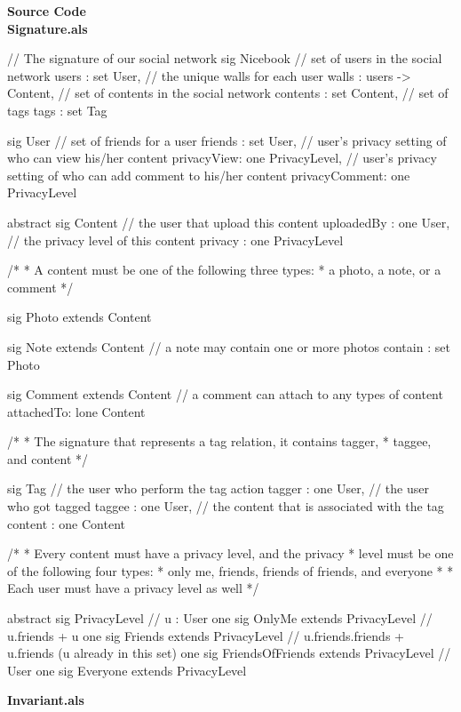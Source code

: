 \documentclass[titlepage]{article}
\begin{document}
{\bf\Large Source Code}\\[1ex]
{\bf\large Signature.als}
\begin{alloy}
// The signature of our social network 
sig Nicebook {
    // set of users in the social network
    users : set User,
    // the unique walls for each user
    walls : users -> Content,
    // set of contents in the social network
    contents : set Content,
    // set of tags
    tags : set Tag
}

sig User {
    // set of friends for a user
    friends : set User,
    // user's privacy setting of who can view his/her content
    privacyView: one PrivacyLevel,
    // user's privacy setting of who can add comment to his/her content
    privacyComment: one PrivacyLevel
}

abstract sig Content {
    // the user that upload this content
    uploadedBy : one User,
    // the privacy level of this content
    privacy : one PrivacyLevel
}

/*
*  	A content must be one of the following three types:
* 	a photo, a note, or a comment
*/

sig Photo extends Content {}

sig Note extends Content {
    // a note may contain one or more photos
    contain : set Photo
}

sig Comment extends Content {
    // a comment can attach to any types of content
    attachedTo: lone Content
}

/*
*  	The signature that represents a tag relation, it contains tagger, 
* 	taggee, and content
*/

sig Tag {
    // the user who perform the tag action
    tagger : one User,
    // the user who got tagged
    taggee : one User,
    // the content that is associated with the tag
    content : one Content
}

/*
* 	Every content must have a privacy level, and the privacy
*	level must be one of the following four types:
*	only me, friends, friends of friends, and everyone
*
*	Each user must have a privacy level as well
*/

abstract sig PrivacyLevel {}
// u : User
one sig OnlyMe extends PrivacyLevel {}
// u.friends + u
one sig Friends extends PrivacyLevel {} 
// u.friends.friends + u.friends (u already in this set)
one sig FriendsOfFriends extends PrivacyLevel {}
// User
one sig Everyone extends PrivacyLevel {}    
\end{alloy}
{\bf\large Invariant.als}
\end{document}
